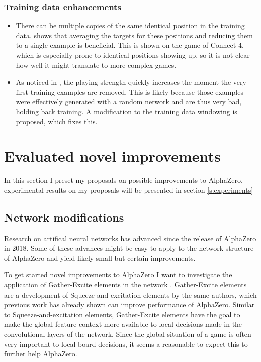 \documentclass[12pt,onecolumn,oneside,titlepage]{article}
\begin{document}
\subsubsection{Training data enhancements}
\begin{itemize}
 \item There can be multiple copies of the same identical position in the training data. \cite{oracledevs6} shows that averaging the targets for these positions and reducing them to a single example is beneficial. This is shown on the game of Connect 4,
 which is especially prone to identical positions showing up, so it is not clear how well it might translate to more complex games.
 \item As noticed in \cite{oracledevs6}, the playing strength quickly increases the moment the very first training examples are removed. This is likely because those examples were effectively generated with a random network and are thus very bad, holding back training.
 A modification to the training data windowing is proposed, which fixes this.
\end{itemize}


\section{Evaluated novel improvements}

In this section I preset my proposals on possible improvements to AlphaZero, experimental results on my proposals will be presented in section \ref{s:experiments}

\subsection{Network modifications}

Research on artifical neural networks has advanced since the release of AlphaZero in 2018. Some of these advances might be easy to apply to the network structure of AlphaZero and yield likely small but certain improvements.

To get started novel improvements to AlphaZero I want to investigate the application of Gather-Excite elements in the network \cite{DBLP:journals/corr/abs-1810-12348}. Gather-Excite elements are a development of Squeeze-and-excitation elements by the same authors, which previous work has already
shown can improve performance of AlphaZero. Similar to Squeeze-and-excitation elements, Gather-Excite elements have the goal to make the global feature context more available to local decisions made in the convolutional layers of the network. Since the global situation of a game is often
very important to local board decisions, it seems a reasonable to expect this to further help AlphaZero.
\end{document}
